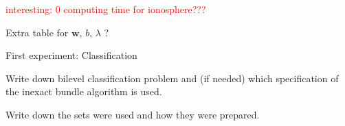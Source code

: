\textcolor{red}{interesting: 0 computing time for ionosphere???}

Extra table for \(\bm{w}\), \(b\), \(\lambda\) ?

First experiment: Classification

Write down bilevel classification problem and (if needed) which specification of the inexact bundle algorithm is used.

Write down the sets were used and how they were prepared.



